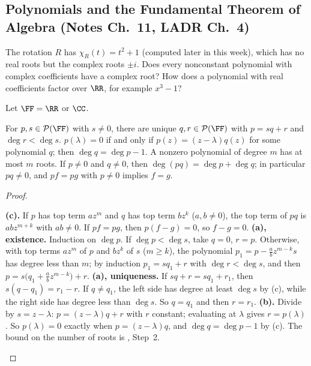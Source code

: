 \documentclass[10pt]{scrartcl}
\newcommand{\PP}{\mathcal P}\newcommand{\LL}{\mathcal L}\newcommand{\MM}{\mathcal M}\newcommand{\T}{\mathsf T}
\begin{document}
\subsection{Polynomials and the Fundamental Theorem of Algebra (Notes Ch.~11, LADR Ch.~4)}

\begin{qbox}
  The rotation $R$ has $\chi_R(t)=t^2+1$ (computed later in this week), which has no real roots but the complex roots $\pm i$. Does every nonconstant polynomial with complex coefficients have a complex root? How does a polynomial with real coefficients factor over $\RR$, for example $x^3-1$?
\end{qbox}

\begin{proposition*}
  Let $\FF=\RR$ or $\CC$.
  \begin{enumerate}[(a)]
    \ii For $p,s\in\PP(\FF)$ with $s\ne 0$, there are unique $q,r\in\PP(\FF)$ with $p=sq+r$ and $\deg r<\deg s$.
    \ii $p(\lambda)=0$ if and only if $p(z)=(z-\lambda)q(z)$ for some polynomial $q$; then $\deg q=\deg p-1$. A nonzero polynomial of degree $m$ has at most $m$ roots.
    \ii If $p\ne0$ and $q\ne0$, then $\deg(pq)=\deg p+\deg q$; in particular $pq\ne0$, and $pf=pg$ with $p\ne0$ implies $f=g$.
  \end{enumerate}
\end{proposition*}
\begin{proof}
  \begin{steps}
    \ii \textbf{(c).} If $p$ has top term $az^m$ and $q$ has top term $bz^k$ ($a,b\ne0$), the top term of $pq$ is $abz^{m+k}$ with $ab\ne0$. If $pf=pg$, then $p(f-g)=0$, so $f-g=0$.
    \ii \textbf{(a), existence.} Induction on $\deg p$. If $\deg p<\deg s$, take $q=0$, $r=p$. Otherwise, with top terms $az^m$ of $p$ and $bz^k$ of $s$ ($m\ge k$), the polynomial $p_1=p-\frac ab z^{m-k}s$ has degree less than $m$; by induction $p_1=sq_1+r$ with $\deg r<\deg s$, and then $p=s\bigl(q_1+\frac abz^{m-k}\bigr)+r$.
    \ii \textbf{(a), uniqueness.} If $sq+r=sq_1+r_1$, then $s(q-q_1)=r_1-r$. If $q\ne q_1$, the left side has degree at least $\deg s$ by (c), while the right side has degree less than $\deg s$. So $q=q_1$ and then $r=r_1$.
    \ii \textbf{(b).} Divide by $s=z-\lambda$: $p=(z-\lambda)q+r$ with $r$ constant; evaluating at $\lambda$ gives $r=p(\lambda)$. So $p(\lambda)=0$ exactly when $p=(z-\lambda)q$, and $\deg q=\deg p-1$ by (c). The bound on the number of roots is , Step~2.
  \end{steps}
\end{proof}
\end{document}
